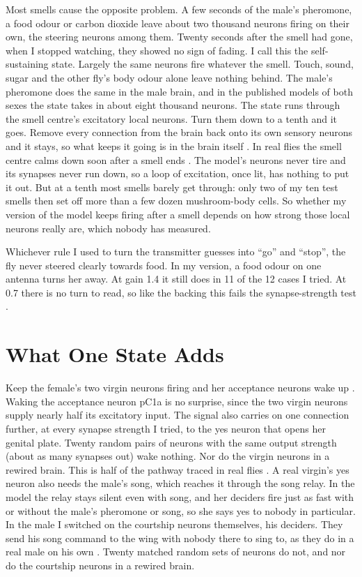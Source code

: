 Most smells cause the opposite problem. A few seconds of the male's pheromone, a food odour or carbon dioxide leave about two thousand neurons firing on their own, the steering neurons among them. Twenty seconds after the smell had gone, when I stopped watching, they showed no sign of fading. I call this the self-sustaining state. Largely the same neurons fire whatever the smell. Touch, sound, sugar and the other fly's body odour alone leave nothing behind. The male's pheromone does the same in the male brain, and in the published models of both sexes the state takes in about eight thousand neurons. The state runs through the smell centre's excitatory local neurons. Turn them down to a tenth and it goes. Remove every connection from the brain back onto its own sensory neurons and it stays, so what keeps it going is in the brain itself . In real flies the smell centre calms down soon after a smell ends \citep{wilson2004transformation}. The model's neurons never tire and its synapses never run down, so a loop of excitation, once lit, has nothing to put it out. But at a tenth most smells barely get through: only two of my ten test smells then set off more than a few dozen mushroom-body cells. So whether my version of the model keeps firing after a smell depends on how strong those local neurons really are, which nobody has measured.

Whichever rule I used to turn the transmitter guesses into ``go'' and ``stop'', the fly never steered clearly towards food. In my version, a food odour on one antenna turns her away. At gain 1.4 it still does in 11 of the 12 cases I tried. At 0.7 there is no turn to read, so like the backing this fails the synapse-strength test .

\section{What One State Adds}
\label{sec:states}

Keep the female's two virgin neurons firing and her acceptance neurons wake up . Waking the acceptance neuron pC1a is no surprise, since the two virgin neurons supply nearly half its excitatory input. The signal also carries on one connection further, at every synapse strength I tried, to the yes neuron that opens her genital plate. Twenty random pairs of neurons with the same output strength (about as many synapses out) wake nothing. Nor do the virgin neurons in a rewired brain. This is half of the pathway traced in real flies \citep{wang2021neural}. A real virgin's yes neuron also needs the male's song, which reaches it through the song relay. In the model the relay stays silent even with song, and her deciders fire just as fast with or without the male's pheromone or song, so she says yes to nobody in particular. In the male I switched on the courtship neurons themselves, his deciders. They send his song command to the wing with nobody there to sing to, as they do in a real male on his own \citep{vonphilipsborn2011neuronal}. Twenty matched random sets of neurons do not, and nor do the courtship neurons in a rewired brain.

